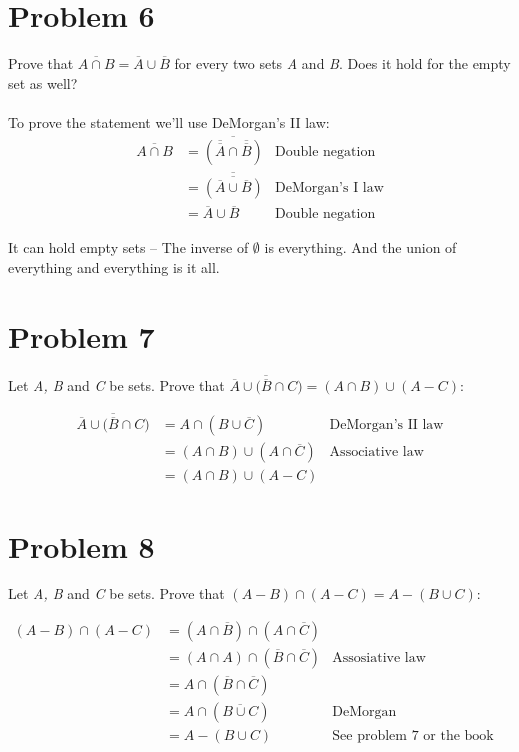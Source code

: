 \documentclass[english,10pt,a4paper]{article}
\begin{document}
\section*{Problem 6}
Prove that $\overline{A \cap B} = \overline{A} \cup \overline{B}$ for every two sets \textit{A} and \textit{B}. Does it hold for the empty set as well?
\\
\\
To prove the statement we'll use DeMorgan's II law:
\begin{align}
\overline{A \cap B} &= \overline{(\overline{\overline{A}} \cap \overline{\overline{B}})} & \text{Double negation}\\
	&= \overline{\overline{(\overline{A} \cup \overline{B})}} & \text{DeMorgan's I law}\\
	&= \overline{A} \cup \overline{B} & \text{Double negation} 
\end{align}

It can hold empty sets -- The inverse of $\emptyset$ is everything. 
And the union of everything and everything is it all.


\section*{Problem 7}
Let \textit{A, B} and \textit{C} be sets. Prove that $\overline{\overline{A} \cup \big( \overline{B} \cap C \big)} = (A \cap B) \cup (A - C)$:

\begin{align}
\overline{\overline{A} \cup \big( \overline{B} \cap C \big)} 
	&= A \cap ( B \cup \overline{C}) & \text{DeMorgan's II law}\\
	&= (A \cap B) \cup (A \cap \overline{C}) & \text{Associative law} \\
	&= (A \cap B) \cup (A - C) &
\end{align}



\section*{Problem 8}
Let \textit{A, B} and \textit{C} be sets. Prove that $(A-B) \cap (A-C) = A-(B\cup C)$:

\begin{align}
(A-B) \cap (A-C) &=(A \cap \overline{B}) \cap (A \cap \overline{C})\\
	&=(A \cap A)  \cap (\overline{B} \cap \overline{C}) & \text{Assosiative law}\\
	&= A \cap (\overline{B} \cap \overline{C})\\
	&= A \cap (\overline{B \cup C}) & \text{DeMorgan}\\
	&= A-(B\cup C) & \text{See problem 7 or the book p. 109}
\end{align}
\end{document}
